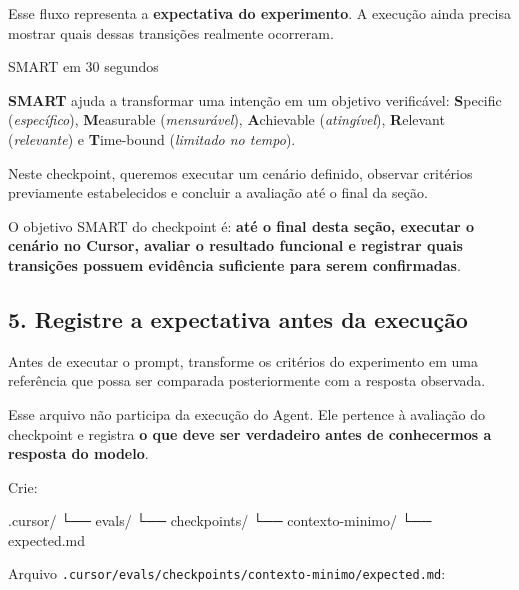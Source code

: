 \documentclass[
  10pt,
  a4paper,
  oneside]{book}
\newenvironment{Shaded}{}{}
\newcommand{\NormalTok}[1]{#1}
\renewenvironment{Shaded}{\begin{snugshade}}{\end{snugshade}}%
\begin{document}
Esse fluxo representa a \textbf{expectativa do experimento}. A execução
ainda precisa mostrar quais dessas transições realmente ocorreram.

\begin{infobox}{SMART em 30 segundos}

\textbf{SMART} ajuda a transformar uma intenção em um objetivo
verificável: \textbf{S}pecific (\emph{específico}), \textbf{M}easurable
(\emph{mensurável}), \textbf{A}chievable (\emph{atingível}),
\textbf{R}elevant (\emph{relevante}) e \textbf{T}ime-bound
(\emph{limitado no tempo}).

Neste checkpoint, queremos executar um cenário definido, observar
critérios previamente estabelecidos e concluir a avaliação até o final
da seção.

\end{infobox}

O objetivo SMART do checkpoint é: \textbf{até o final desta seção,
executar o cenário no Cursor, avaliar o resultado funcional e registrar
quais transições possuem evidência suficiente para serem confirmadas}.

\hypertarget{registre-a-expectativa-antes-da-execuuxe7uxe3o}{%
\subsection{5. Registre a expectativa antes da
execução}\label{registre-a-expectativa-antes-da-execuuxe7uxe3o}}

Antes de executar o prompt, transforme os critérios do experimento em
uma referência que possa ser comparada posteriormente com a resposta
observada.

Esse arquivo não participa da execução do Agent. Ele pertence à
avaliação do checkpoint e registra \textbf{o que deve ser verdadeiro
antes de conhecermos a resposta do modelo}.

Crie:

\begin{Shaded}
\begin{Highlighting}[]
\NormalTok{.cursor/}
\NormalTok{└── evals/}
\NormalTok{    └── checkpoints/}
\NormalTok{        └── contexto{-}minimo/}
\NormalTok{            └── expected.md}
\end{Highlighting}
\end{Shaded}

Arquivo \texttt{.cursor/evals/checkpoints/contexto-minimo/expected.md}:
\end{document}
